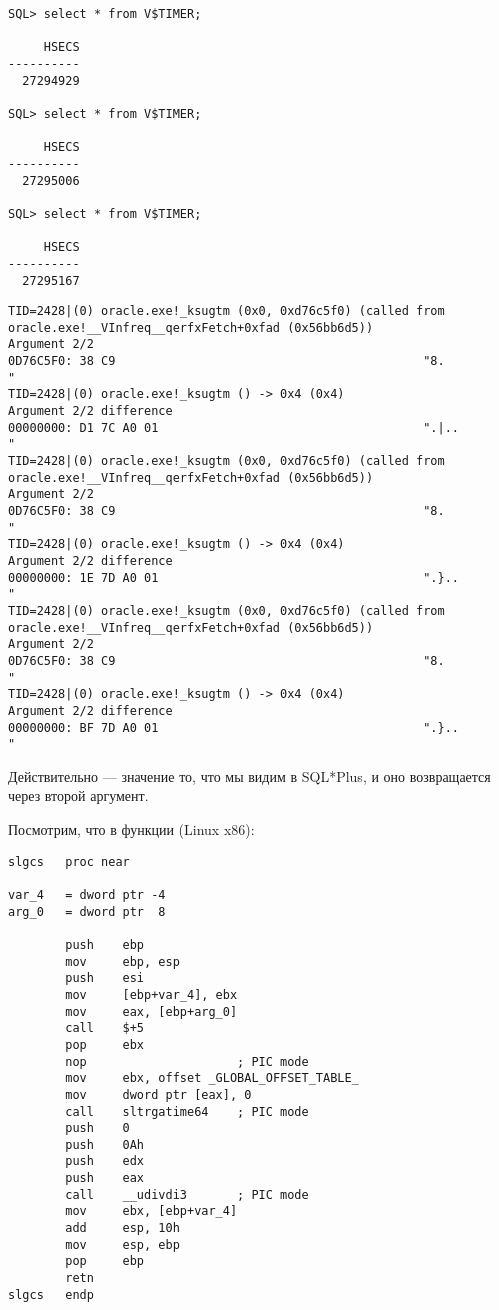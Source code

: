 \begin{lstlisting}
SQL> select * from V$TIMER;

     HSECS
----------
  27294929

SQL> select * from V$TIMER;

     HSECS
----------
  27295006

SQL> select * from V$TIMER;

     HSECS
----------
  27295167
\end{lstlisting}

\begin{lstlisting}[caption=вывод \tracer]
TID=2428|(0) oracle.exe!_ksugtm (0x0, 0xd76c5f0) (called from oracle.exe!__VInfreq__qerfxFetch+0xfad (0x56bb6d5))
Argument 2/2
0D76C5F0: 38 C9                                           "8.              "
TID=2428|(0) oracle.exe!_ksugtm () -> 0x4 (0x4)
Argument 2/2 difference
00000000: D1 7C A0 01                                     ".|..            "
TID=2428|(0) oracle.exe!_ksugtm (0x0, 0xd76c5f0) (called from oracle.exe!__VInfreq__qerfxFetch+0xfad (0x56bb6d5))
Argument 2/2
0D76C5F0: 38 C9                                           "8.              "
TID=2428|(0) oracle.exe!_ksugtm () -> 0x4 (0x4)
Argument 2/2 difference
00000000: 1E 7D A0 01                                     ".}..            "
TID=2428|(0) oracle.exe!_ksugtm (0x0, 0xd76c5f0) (called from oracle.exe!__VInfreq__qerfxFetch+0xfad (0x56bb6d5))
Argument 2/2
0D76C5F0: 38 C9                                           "8.              "
TID=2428|(0) oracle.exe!_ksugtm () -> 0x4 (0x4)
Argument 2/2 difference
00000000: BF 7D A0 01                                     ".}..            "
\end{lstlisting}

Действительно --- значение то, что мы видим в SQL*Plus, и оно возвращается через второй аргумент.

Посмотрим, что в функции  (Linux x86):

\begin{lstlisting}[style=customasmx86]
slgcs   proc near

var_4   = dword ptr -4
arg_0   = dword ptr  8

        push    ebp
        mov     ebp, esp
        push    esi
        mov     [ebp+var_4], ebx
        mov     eax, [ebp+arg_0]
        call    $+5
        pop     ebx
        nop                     ; PIC mode
        mov     ebx, offset _GLOBAL_OFFSET_TABLE_
        mov     dword ptr [eax], 0
        call    sltrgatime64    ; PIC mode
        push    0
        push    0Ah
        push    edx
        push    eax
        call    __udivdi3       ; PIC mode
        mov     ebx, [ebp+var_4]
        add     esp, 10h
        mov     esp, ebp
        pop     ebp
        retn
slgcs   endp
\end{lstlisting}

